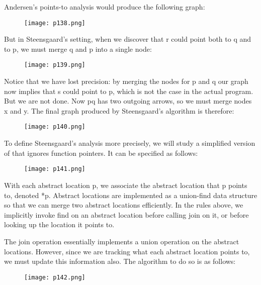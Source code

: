 Andersen’s points-to analysis would produce the following graph:
\begin{figure}[H]
	\centering
	\texttt{[image: p138.png]}
	\caption{}
	\label{fig:p138}
\end{figure}

But in Steensgaard’s setting, when we discover that r could point both to q and to p, we must
merge q and p into a single node:

\begin{figure}[H]
	\centering
	\texttt{[image: p139.png]}
	\caption{}
	\label{fig:p139}
\end{figure}


Notice that we have lost precision: by merging the nodes for p and q our graph now implies
that s could point to p, which is not the case in the actual program. But we are not done. Now
pq has two outgoing arrows, so we must merge nodes x and y. The final graph produced by
Steensgaard’s algorithm is therefore:

\begin{figure}[H]
	\centering
	\texttt{[image: p140.png]}
	\caption{}
	\label{fig:p140}
\end{figure}

To define Steensgaard’s analysis more precisely, we will study a simplified version of that
ignores function pointers. It can be specified as follows:

\begin{figure}[H]
	\centering
	\texttt{[image: p141.png]}
	\caption{}
	\label{fig:p141}
\end{figure}

With each abstract location p, we associate the abstract location that p 
points to, denoted *p.
Abstract locations are implemented as a union-find data structure so that we can merge two
abstract locations efficiently. In the rules above, we implicitly invoke find on an abstract location
before calling join on it, or before looking up the location it points to.

The join operation essentially implements a union operation on the abstract locations. However, since we are tracking what each abstract location points to, we must update this information
also. The algorithm to do so is as follows:

\begin{figure}[H]
	\centering
	\texttt{[image: p142.png]}
	\caption{}
	\label{fig:p142}
\end{figure}


